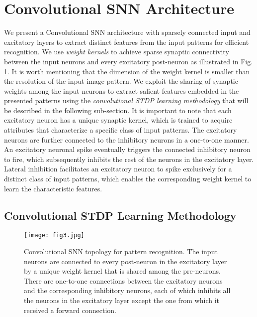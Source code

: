 \documentclass[journal, onecolumn]{IEEEtran}
\begin{document}
\section*{\large\bf{Convolutional SNN Architecture}}
We present a Convolutional SNN architecture with sparsely connected input and excitatory layers to extract distinct features from the input patterns for efficient recognition. We use \textit{weight kernels} to achieve sparse synaptic connectivity between the input neurons and every excitatory post-neuron as illustrated in Fig. \ref{fig:Conv_SNN}. It is worth mentioning that the dimension of the weight kernel is smaller than the resolution of the input image pattern. We exploit the sharing of synaptic weights among the input neurons to extract salient features embedded in the presented patterns using the \textit{convolutional STDP learning methodology} that will be described in the following sub-section. It is important to note that each excitatory neuron has a unique synaptic kernel, which is trained to acquire attributes that characterize a specific class of input patterns. The excitatory neurons are further connected to the inhibitory neurons in a one-to-one manner. An excitatory neuronal spike eventually triggers the connected inhibitory neuron to fire, which subsequently inhibits the rest of the neurons in the excitatory layer. Lateral inhibition facilitates an excitatory neuron to spike exclusively for a distinct class of input patterns, which enables the corresponding weight kernel to learn the characteristic features.

\subsection*{\normalsize\bf{Convolutional STDP Learning Methodology}}
\begin{figure}[!t]
\centering
\texttt{[image: fig3.jpg]}
\caption{Convolutional SNN topology for pattern recognition. The input neurons are connected to every post-neuron in the excitatory layer by a unique weight kernel that is shared among the pre-neurons. There are one-to-one connections between the excitatory neurons and the corresponding inhibitory neurons, each of which inhibits all the neurons in the excitatory layer except the one from which it received a forward connection.}
\label{fig:Conv_SNN}
\end{figure}
\end{document}

